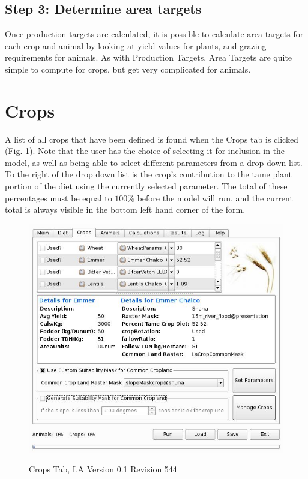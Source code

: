 \subsection{Step 3: Determine area targets}
Once production targets are calculated, it is possible to calculate area
targets for each crop and animal by looking at yield values for plants, and
grazing requirements for animals.  As with Production Targets, Area Targets are
quite simple to compute for crops, but get very complicated for animals.

  \section{Crops}
    A list of all crops that have been defined is found when the Crops tab is
    clicked (Fig. \ref{fig:crop}).  Note that the user has the choice of
    selecting it for inclusion in the model, as well as being able to select
    different parameters from a drop-down list.  To the right of the drop down
    list is the crop's contribution to the tame plant portion of the diet using
    the currently selected parameter.  The total of these percentages must be
    equal to $100\%$ before the model will run, and the current total is always
    visible in the bottom left hand corner of the form.

    \begin{figure}[htbp]
        \includegraphics[scale=.366]{./images/LanduseAnalystCrops546.jpg}
      \label{fig:crop} \caption{Crops Tab, LA Version 0.1 Revision 544}
    \end{figure}
    
